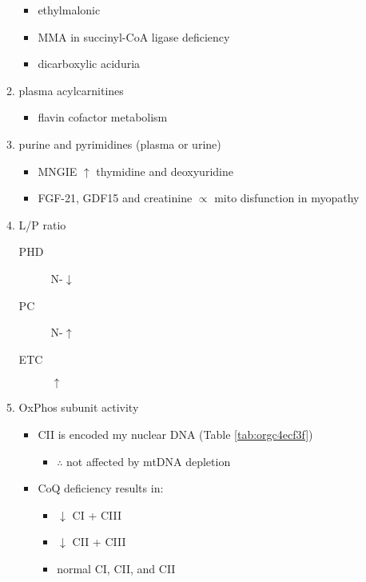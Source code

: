 \documentclass{scrartcl}
\begin{document}
\begin{enumerate}
\begin{enumerate}
\begin{itemize}
\item ethylmalonic
\item MMA in succinyl-CoA ligase deficiency
\item dicarboxylic aciduria
\end{itemize}
\item plasma acylcarnitines
\label{sec:orgf0d3ec7}
\begin{itemize}
\item flavin cofactor metabolism
\end{itemize}
\item purine and pyrimidines (plasma or urine)
\label{sec:org9abecd1}
\begin{itemize}
\item MNGIE \(\uparrow\) thymidine and deoxyuridine
\end{itemize}
\begin{itemize}
\item FGF-21, GDF15 and creatinine \(\propto\) mito disfunction in myopathy
\end{itemize}

\item L/P ratio
\label{sec:org601f928}
\begin{description}
\item[{PHD}] N-\(\downarrow\)
\item[{PC}] N-\(\uparrow\)
\item[{ETC}] \(\uparrow\)
\end{description}
\item OxPhos subunit activity
\label{sec:org0b52c27}
\begin{itemize}
\item CII is encoded my nuclear DNA (Table \ref{tab:orgc4ecf3f})
\begin{itemize}
\item \(\therefore\) not affected by mtDNA depletion
\end{itemize}
\item CoQ deficiency results in:
\begin{itemize}
\item \(\downarrow\) CI + CIII
\item \(\downarrow\) CII + CIII
\item normal CI, CII, and CII
\end{itemize}
\end{itemize}
\end{enumerate}


\end{enumerate}
\end{document}
